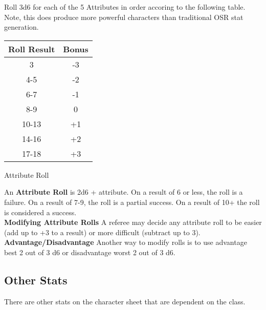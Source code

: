 \documentclass[18pt]{article}
\begin{document}
\begin{multicols}{2}
Roll 3d6 for each of the 5 Attributes in order accoring to the following table. Note, this does produce more powerful characters than traditional OSR stat generation.


\begin{table}[H]

\begin{center}
\Large
{}
\begin{tabular}{ c  c  }


\textbf{
Roll Result} &\textbf{ Bonus}\\
\bottomrule
\bottomrule

3 & -3 \\

4-5 & -2 \\

6-7 & -1 \\

8-9 & 0 \\

10-13 & +1 \\

14-16 & +2 \\

17-18 & +3 \\

\end{tabular}
\end{center}
\label{table:RollingAttributes}
\vspace{-1cm}
\end{table}
\vspace{1cm}
\begin{mercHeading}
Attribute Roll
\end{mercHeading}

An \textbf{Attribute Roll} is 2d6 + attribute. On a result of 6 or less, the roll is a failure. On a result of 7-9, the roll is a partial success. On a result of 10+ the roll is considered a success.\\
\textbf{Modifying Attribute Rolls} A referee may decide any attribute roll to be easier (add up to +3 to a result) or more difficult (subtract up to 3). \\
\textbf{Advantage/Disadvantage} Another way to modify rolls is to use advantage best 2 out of 3 d6 or disadvantage worst 2 out of 3 d6.
\subsection*{Other Stats}
There are other stats on the character sheet that are dependent on the class.


\end{multicols}
\end{document}

